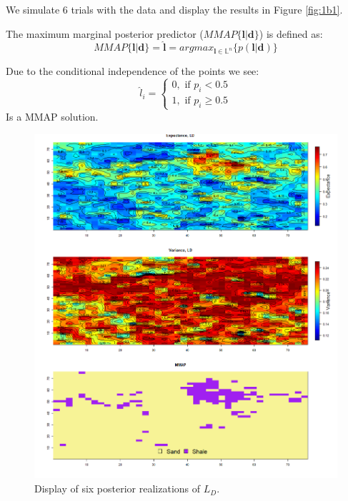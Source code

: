 \documentclass{article}
\newcommand{\vect}[1]{\ensuremath{\boldsymbol{\mathbf{#1}}}}
\begin{document}
	
	We simulate 6 trials with the data and display the results in Figure \ref{fig:1b1}. 
	
	The maximum marginal posterior predictor ($MMAP\lbrace \vect l | \vect d \rbrace$) is defined as: 
	\begin{equation} \label{eq:mmap}
		MMAP\lbrace \vect l | \vect d \rbrace = \vect{\hat l} = argmax_{\vect l \in \mathbb{L}^n}\lbrace p(\vect l | \vect d)\rbrace
	\end{equation}
	
	Due to the conditional independence of the points we see: 
	\begin{equation}
		\hat l_i = \begin{cases}
		0, \text{ if } p_i < 0.5 \\
		1, \text{ if } p_i \geq 0.5
		\end{cases}
	\end{equation}
	Is a MMAP solution. 
		\begin{figure}[h]	
		\begin{center} 
			\includegraphics[scale=0.48]{figure4.png}
		\end{center}
		\caption{Display of six posterior realizations of $L_D$.}
		\label{fig:1b2} 
	\end{figure}
	
\end{document}

